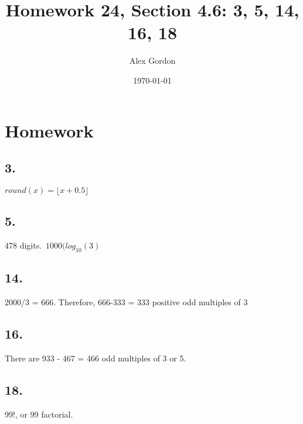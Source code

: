 \documentclass[12]{scrartcl}
\begin{document}
\title{Homework 24, Section 4.6: 3, 5, 14, 16, 18}
\author{Alex Gordon}
\date{\today}
\maketitle
\section*{Homework}
\subsection*{3.}
$round(x)=\lfloor x+0.5 \rfloor$

\subsection*{5.}
478 digits.\
$1000(log_{10}(3)$
\subsection*{14.}
2000/3 = 666. Therefore, 666-333 =  333 positive odd multiples of 3
\subsection*{16.}
There are 933 - 467 = 466 odd multiples of 3 or 5. 
\subsection*{18.}
99!, or 99 factorial. 
\end{document}

